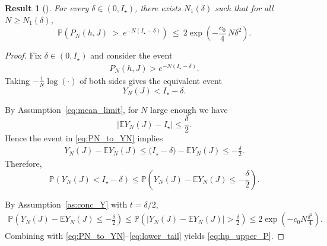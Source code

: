 \documentclass{article}
\newtheorem{theorem}{Result}
\theoremstyle{remark} %
\begin{document}
\begin{theorem}[]\label{lem:pstar_lt1}
For every $\delta\in(0,I_\star)$, there exists $N_1(\delta)$ such that for all $N\ge N_1(\delta)$,
\begin{equation}\label{eq:hp_upper_P}
\mathbb P \left(P_N(h,J)\ >\ e^{-N(I_\star-\delta)}\right)
\ \le\ 2\exp \left(-\frac{c_0}{4}\,N\delta^2\right).
\end{equation}
\end{theorem}

\begin{proof}
Fix $\delta\in(0,I_\star)$ and consider the event
\begin{align}
P_N(h,J) > e^{-N(I_\star-\delta)}.
\end{align}
Taking $-\frac1N\log(\cdot)$ of both sides gives the equivalent event
\begin{equation}\label{eq:PN_to_YN}
Y_N(J) < I_\star-\delta.
\end{equation}


By Assumption~\ref{eq:mean_limit}, for $N$ large enough we have
\begin{equation}\label{eq:mean_close}
\big|\mathbb E Y_N(J)-I_\star\big|\le \frac{\delta}{2}.
\end{equation}
Hence the event in \eqref{eq:PN_to_YN} implies
\begin{align}
Y_N(J)-\mathbb E Y_N(J)
\le \big(I_\star-\delta\big)-\mathbb E Y_N(J)
\le -\frac{\delta}{2}.
\end{align}
Therefore,
\begin{equation}\label{eq:lower_tail}
\mathbb P \left(Y_N(J)<I_\star-\delta\right)
\le
\mathbb P \left(Y_N(J)-\mathbb E Y_N(J)\le -\frac{\delta}{2}\right).
\end{equation}

By Assumption~\ref{as:conc_Y} with $t=\delta/2$,
\begin{align}
\mathbb P \left(Y_N(J)-\mathbb E Y_N(J)\le -\frac{\delta}{2}\right)
\le
\mathbb P \left(\big|Y_N(J)-\mathbb E Y_N(J)\big|>\frac{\delta}{2}\right)
\le 2\exp \left(-c_0 N\frac{\delta^2}{4}\right).
\end{align}
Combining with \eqref{eq:PN_to_YN}--\eqref{eq:lower_tail} yields \eqref{eq:hp_upper_P}.


\end{proof}
\end{document}
